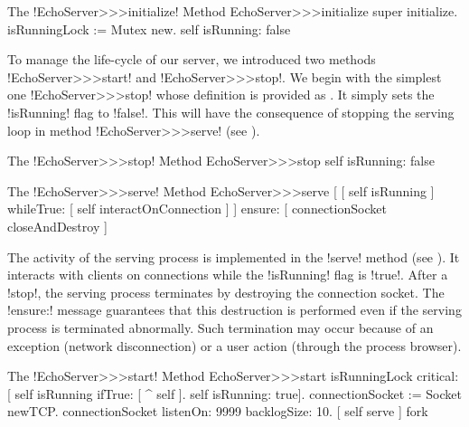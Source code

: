 \documentclass[a4paper,10pt,twoside]{book}
\begin{document}
\begin{method}{The \ct!EchoServer>>>initialize! Method}
EchoServer>>>initialize 
	super initialize.
	isRunningLock := Mutex new.
	self isRunning: false
\end{method}

To manage the life-cycle of our server, we introduced two methods \ct!EchoServer>>>start! and \ct!EchoServer>>>stop!.
We begin with the simplest one \ct!EchoServer>>>stop! whose definition is provided as .
It simply sets the \ct!isRunning! flag to \ct!false!.
This will have the consequence of stopping the serving loop in method \ct!EchoServer>>>serve! (see ). 

\begin{method}{The \ct!EchoServer>>>stop! Method}
EchoServer>>>stop
	self isRunning: false
\end{method}

\begin{method}{The \ct!EchoServer>>>serve! Method}
EchoServer>>>serve
	[ [ self isRunning ]
		whileTrue: [ self interactOnConnection ] ]
		ensure: [ connectionSocket closeAndDestroy ]
\end{method}

The activity of the serving process is implemented in the \ct!serve! method (see ).
It interacts with clients on connections while the \ct!isRunning! flag is \ct!true!.
After a \ct!stop!, the serving process terminates by destroying the connection socket.
The \ct!ensure:! message guarantees that this destruction is performed even if the serving process is terminated abnormally. 
Such termination may occur because of an exception (\eg network disconnection) or a user action (\eg through the process browser).   

\begin{method}{The \ct!EchoServer>>>start! Method}
EchoServer>>>start
	isRunningLock critical: [
		self isRunning ifTrue: [ ^ self ].
		self isRunning: true].
	connectionSocket := Socket newTCP.
	connectionSocket listenOn: 9999 backlogSize: 10.
	[ self serve ] fork
\end{method}
\end{document}
